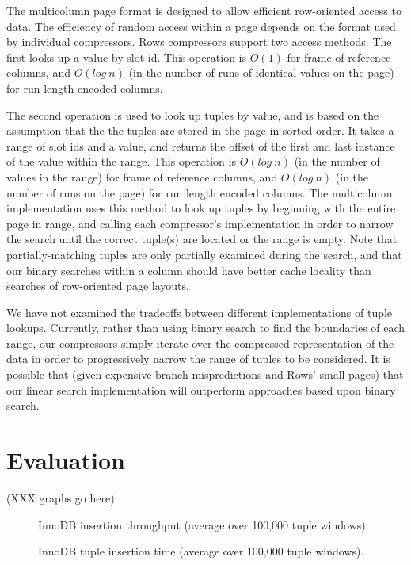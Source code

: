 \documentclass{sig-alternate-sigmod08}
\newcommand{\rows}{Rows\xspace}
\newcommand{\rowss}{Rows'\xspace}
\begin{document}
The multicolumn page format is designed to allow efficient
row-oriented access to data.  The efficiency of random access within a
page depends on the format used by individual compressors.  \rows
compressors support two access methods.  The first looks up a value by
slot id.  This operation is $O(1)$ for frame of reference columns, and
$O(log~n)$ (in the number of runs of identical values on the page) for
run length encoded columns.

The second operation is used to look up tuples by value, and is based
on the assumption that the the tuples are stored in the page in sorted
order.  It takes a range of slot ids and a value, and returns the
offset of the first and last instance of the value within the range.
This operation is $O(log~n)$ (in the number of values in the range)
for frame of reference columns, and $O(log~n)$ (in the number of runs
on the page) for run length encoded columns.  The multicolumn
implementation uses this method to look up tuples by beginning with
the entire page in range, and calling each compressor's implementation
in order to narrow the search until the correct tuple(s) are located
or the range is empty.  Note that partially-matching tuples are only
partially examined during the search, and that our binary searches
within a column should have better cache locality than searches of
row-oriented page layouts.

We have not examined the tradeoffs between different implementations
of tuple lookups.  Currently, rather than using binary search to find
the boundaries of each range, our compressors simply iterate over the
compressed representation of the data in order to progressively narrow
the range of tuples to be considered.  It is possible that (given
expensive branch mispredictions and \rowss small pages) that our
linear search implementation will outperform approaches based upon
binary search.

\section{Evaluation}
(XXX graphs go here)
\begin{figure}
\centering
{}
\caption{InnoDB insertion throughput (average over 100,000 tuple windows).}
\end{figure}
\begin{figure}
\centering
{}
\caption{InnoDB tuple insertion time (average over 100,000 tuple windows).}
\end{figure}
\end{document}
